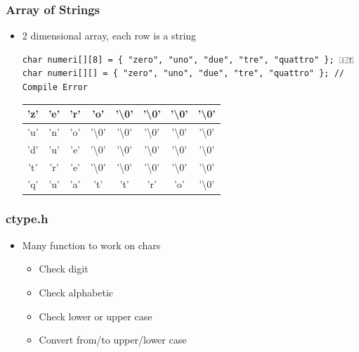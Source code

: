 \documentclass{../c-lecture}
\begin{document}
\begin{frame}[fragile]
  \frametitle{Array of Strings}
  \begin{itemize}
    \item 2 dimensional array, each row is a string
    \scriptsize
    \begin{verbatim}
char numeri[][8] = { "zero", "uno", "due", "tre", "quattro" }; 🇮🇹
char numeri[][] = { "zero", "uno", "due", "tre", "quattro" }; // Compile Error
    \end{verbatim}
    \begin{table}
    \begin{tabular}{*{8}{c}}
      \toprule
        'z' &
        'e' &
        'r' &
        'o' &
        '\textbackslash 0' &
        '\textbackslash 0' &
        '\textbackslash 0' &
        '\textbackslash 0' \\
      \midrule
        'u' &
        'n' &
        'o' &
        '\textbackslash 0' &
        '\textbackslash 0' &
        '\textbackslash 0' &
        '\textbackslash 0' &
        '\textbackslash 0' \\
      \midrule
        'd' &
        'u' &
        'e' &
        '\textbackslash 0' &
        '\textbackslash 0' &
        '\textbackslash 0' &
        '\textbackslash 0' &
        '\textbackslash 0' \\
      \midrule
        't' &
        'r' &
        'e' &
        '\textbackslash 0' &
        '\textbackslash 0' &
        '\textbackslash 0' &
        '\textbackslash 0' &
        '\textbackslash 0' \\
      \midrule
        'q' &
        'u' &
        'a' &
        't' &
        't' &
        'r' &
        'o' &
        '\textbackslash 0' \\
      \bottomrule
    \end{tabular}
    \end{table}
  \end{itemize}
\end{frame}

\begin{frame}
  \frametitle{ctype.h}
  \begin{itemize}
    \item Many function to work on chars
    \begin{itemize}
      \item Check digit
      \item Check alphabetic
      \item Check lower or upper case
      \item Convert from/to upper/lower case
    \end{itemize}
  \end{itemize}
\end{frame}
\end{document}
